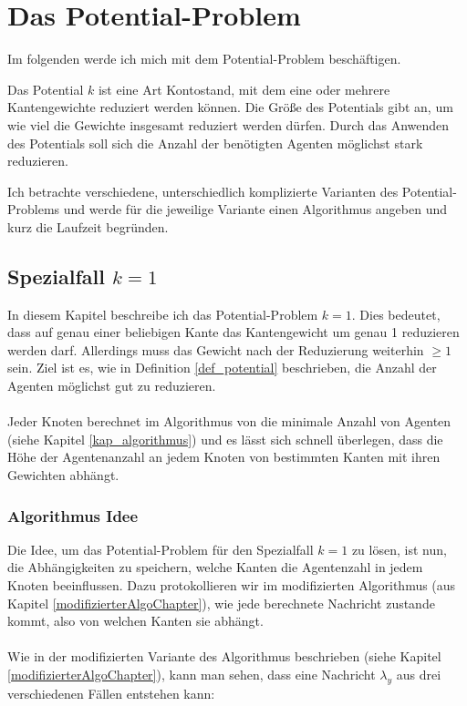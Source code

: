 \section{Das Potential-Problem}\label{kap_pot}

Im folgenden werde ich mich mit dem Potential-Problem beschäftigen.

\begin{mydef}\label{def_potential}
	Das Potential $k$ ist eine Art Kontostand, mit dem eine oder mehrere Kantengewichte reduziert werden können. Die Größe des Potentials gibt an, um wie viel die Gewichte insgesamt reduziert werden dürfen. Durch das Anwenden des Potentials soll sich die Anzahl der benötigten Agenten möglichst stark reduzieren.
\end{mydef}

Ich betrachte verschiedene, unterschiedlich komplizierte Varianten des Potential-Problems und werde für die jeweilige Variante einen Algorithmus angeben und kurz die Laufzeit begründen.

\subsection{Spezialfall $k = 1$}\label{kap_pot=1}

In diesem Kapitel beschreibe ich das Potential-Problem $k = 1$. Dies bedeutet, dass auf genau einer beliebigen Kante das Kantengewicht um genau 1 reduzieren werden darf. Allerdings muss das Gewicht nach der Reduzierung  weiterhin $\geq 1$ sein. Ziel ist es, wie in Definition \ref{def_potential} beschrieben, die Anzahl der Agenten möglichst gut zu reduzieren.
\\
\\
Jeder Knoten berechnet im Algorithmus von \cite{cima_paper} die minimale Anzahl von Agenten (siehe Kapitel \ref{kap_algorithmus}) und es lässt sich schnell überlegen, dass die Höhe der Agentenanzahl an jedem Knoten von bestimmten Kanten mit ihren Gewichten abhängt.


\subsubsection{Algorithmus Idee}

Die Idee, um das Potential-Problem für den Spezialfall $k = 1$ zu lösen, ist nun, die Abhängigkeiten zu speichern, welche Kanten die Agentenzahl in jedem Knoten beeinflussen. Dazu protokollieren wir im modifizierten Algorithmus (aus Kapitel \ref{modifizierterAlgoChapter}), wie jede berechnete Nachricht zustande kommt, also von welchen Kanten sie abhängt.
\\
\\ 
Wie in der modifizierten Variante des Algorithmus beschrieben (siehe Kapitel \ref{modifizierterAlgoChapter}), kann man sehen, dass eine Nachricht $\lambda_{y}$ aus drei verschiedenen Fällen entstehen kann:

